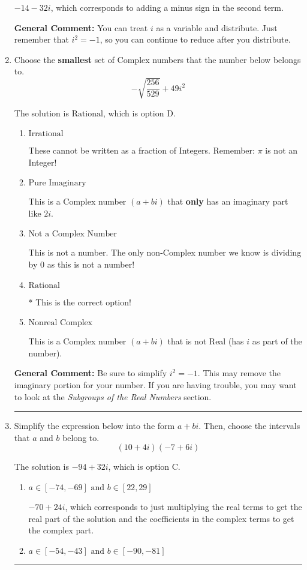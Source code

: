 \documentclass{extbook}[14pt]
\newcommand{\litem}[1]{\item #1

\rule{\textwidth}{0.4pt}}
\begin{document}
\begin{enumerate}
{\begin{enumerate}[label=\Alph*.]
 $-14 - 32 i$, which corresponds to adding a minus sign in the second term.
\end{enumerate}

\textbf{General Comment:} You can treat $i$ as a variable and distribute. Just remember that $i^2=-1$, so you can continue to reduce after you distribute.
}
\litem{
Choose the \textbf{smallest} set of Complex numbers that the number below belongs to.
\[ -\sqrt{\frac{256}{529}} + 49i^2 \]

The solution is \( \text{Rational} \), which is option D.\begin{enumerate}[label=\Alph*.]
\item \( \text{Irrational} \)

These cannot be written as a fraction of Integers. Remember: $\pi$ is not an Integer!
\item \( \text{Pure Imaginary} \)

This is a Complex number $(a+bi)$ that \textbf{only} has an imaginary part like $2i$.
\item \( \text{Not a Complex Number} \)

This is not a number. The only non-Complex number we know is dividing by 0 as this is not a number!
\item \( \text{Rational} \)

* This is the correct option!
\item \( \text{Nonreal Complex} \)

This is a Complex number $(a+bi)$ that is not Real (has $i$ as part of the number).
\end{enumerate}

\textbf{General Comment:} Be sure to simplify $i^2 = -1$. This may remove the imaginary portion for your number. If you are having trouble, you may want to look at the \textit{Subgroups of the Real Numbers} section.
}
\litem{
Simplify the expression below into the form $a+bi$. Then, choose the intervals that $a$ and $b$ belong to.
\[ (10 + 4 i)(-7 + 6 i) \]

The solution is \( -94 + 32 i \), which is option C.\begin{enumerate}[label=\Alph*.]
\item \( a \in [-74, -69] \text{ and } b \in [22, 29] \)

 $-70 + 24 i$, which corresponds to just multiplying the real terms to get the real part of the solution and the coefficients in the complex terms to get the complex part.
\item \( a \in [-54, -43] \text{ and } b \in [-90, -81] \)


\end{enumerate}}
\end{enumerate}
\end{document}
